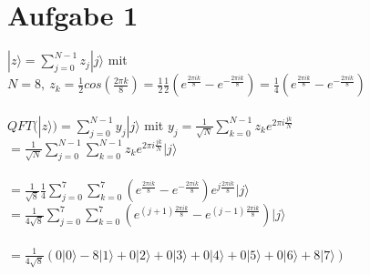 \documentclass[a4paper]{scrartcl}
\begin{document}
\section*{Aufgabe 1}
$|z\rangle = \sum_{j=0}^{N-1} z_j |j\rangle$ mit $N=8,~ z_k=\frac{1}{2}cos(\frac{2\pi k}{8}) = \frac{1}{2} \frac{1}{2} (e^{\frac{2\pi i k}{8}} - e^{-\frac{2\pi i k}{8}})=\frac{1}{4}(e^{\frac{2\pi i k}{8}} - e^{-\frac{2\pi i k}{8}})$\\\\
$QFT(|z\rangle) = \sum_{j=0}^{N-1}y_j |j\rangle$ mit $y_j=\frac{1}{\sqrt{N}}\sum_{k=0}^{N-1}z_k e^{2\pi i \frac{jk}{N}}$\\
$=\frac{1}{\sqrt{N}}\sum_{j=0}^{N-1}\sum_{k=0}^{N-1}z_k e^{2\pi i \frac{jk}{N}} |j\rangle$\\\\
$=\frac{1}{\sqrt{8}}\frac{1}{4}\sum_{j=0}^{7}\sum_{k=0}^{7}(e^{\frac{2\pi i k}{8}} - e^{-\frac{2\pi i k}{8}}) e^{j \frac{2\pi ik}{8}} |j\rangle$\\
$=\frac{1}{4\sqrt{8}}\sum_{j=0}^{7}\sum_{k=0}^{7}(e^{(j+1)\frac{2\pi i k}{8}} - e^{(j-1)\frac{2\pi i k}{8}}) |j\rangle$ \\\\
$=\frac{1}{4\sqrt{8}} ( 0 |0\rangle -8 |1\rangle + 0 |2\rangle + 0 |3\rangle + 0 |4\rangle+ 0|5\rangle+ 0|6\rangle+ 8|7\rangle)$


\newpage
\end{document}
